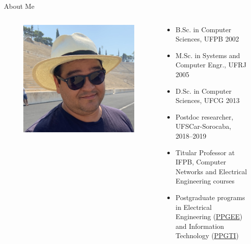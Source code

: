 
\begin{frame}{About Me}
    \begin{columns}
        \begin{column}{0.2\textwidth}
            \begin{figure}
                \centering                \includegraphics[scale=0.05]{figs/paulo.jpg}
            \end{figure} 
        \end{column}
        \begin{column}{0.8\textwidth}
            \begin{itemize}
                \item B.Sc. in Computer Sciences, UFPB 2002
                \item M.Sc. in Systems and Computer Engr., UFRJ 2005
                \item D.Sc. in Computer Sciences, UFCG 2013
                \item Postdoc researcher, UFSCar-Sorocaba, 2018--2019
                \item Titular Professor at IFPB, Computer Networks and Electrical Engineering courses
                \item Postgraduate programs in Electrical Engineering (\href{https://www.ifpb.edu.br/ppgee}{PPGEE}) and Information Technology (\href{https://www.ifpb.edu.br/ppgti}{PPGTI})
            \end{itemize}
        \end{column}
    \end{columns}
\end{frame}